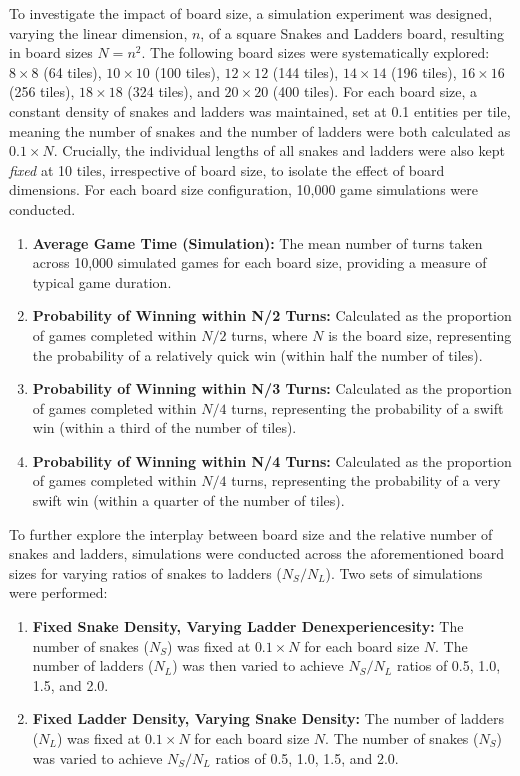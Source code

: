 To investigate the impact of board size, a simulation experiment was designed, varying the linear dimension, $n$, of a square Snakes and Ladders board, resulting in board sizes $N = n^2$. The following board sizes were systematically explored: $8 \times 8$ (64 tiles), $10 \times 10$ (100 tiles), $12 \times 12$ (144 tiles), $14 \times 14$ (196 tiles), $16 \times 16$ (256 tiles), $18 \times 18$ (324 tiles), and $20 \times 20$ (400 tiles).  For each board size, a constant density of snakes and ladders was maintained, set at 0.1 entities per tile, meaning the number of snakes and the number of ladders were both calculated as $0.1 \times N$.  Crucially, the individual lengths of all snakes and ladders were also kept \textit{fixed} at 10 tiles, irrespective of board size, to isolate the effect of board dimensions. For each board size configuration, 10,000 game simulations were conducted.


\begin{enumerate}
	\item \textbf{Average Game Time (Simulation):}  The mean number of turns taken across 10,000 simulated games for each board size, providing a measure of typical game duration.
	\item \textbf{Probability of Winning within N/2 Turns:} Calculated as the proportion of games completed within $N/2$ turns, where $N$ is the board size, representing the probability of a relatively quick win (within half the number of tiles).
	\item \textbf{Probability of Winning within N/3 Turns:}  Calculated as the proportion of games completed within $N/4$ turns, representing the probability of a swift win (within a third of the number of tiles).
	\item \textbf{Probability of Winning within N/4 Turns:}  Calculated as the proportion of games completed within $N/4$ turns, representing the probability of a very swift win (within a quarter of the number of tiles).
\end{enumerate}

To further explore the interplay between board size and the relative number of snakes and ladders, simulations were conducted across the aforementioned board sizes for varying ratios of snakes to ladders ($N_S/N_L$).  Two sets of simulations were performed:

\begin{enumerate}
	\item \textbf{Fixed Snake Density, Varying Ladder Denexperiencesity:} The number of snakes ($N_S$) was fixed at $0.1 \times N$ for each board size $N$. The number of ladders ($N_L$) was then varied to achieve $N_S/N_L$ ratios of 0.5, 1.0, 1.5, and 2.0.
	\item \textbf{Fixed Ladder Density, Varying Snake Density:} The number of ladders ($N_L$) was fixed at $0.1 \times N$ for each board size $N$. The number of snakes ($N_S$) was varied to achieve $N_S/N_L$ ratios of 0.5, 1.0, 1.5, and 2.0.
\end{enumerate}

